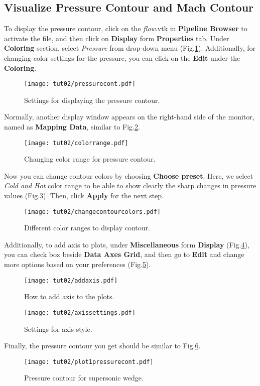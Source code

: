 \subsection{Visualize Pressure Contour and Mach Contour}
To display the pressure contour, click on the \textit{flow}.vtk in \textbf{Pipeline Browser} to activate the file, and then click on \textbf{Display} form \textbf{Properties} tab. Under \textbf{Coloring} section, select \textit{Pressure} from drop-down menu (Fig.\ref{fig2:pressure contours setting}). Additionally, for changing color settings for the pressure, you can click on the \textbf{Edit} under the \textbf{Coloring}.
\begin{figure}[htbp]
    \centering
    \texttt{[image: tut02/pressurecont.pdf]}
    \caption{Settings for displaying the pressure contour.}
    \label{fig2:pressure contours setting}
\end{figure}
Normally, another display window appears on the right-hand side of the monitor, named as \textbf{Mapping Data}, similar to Fig.\ref{fig2:color_range}.
\begin{figure}[htbp]
    \centering
    \texttt{[image: tut02/colorrange.pdf]}
    \caption{Changing color range for pressure contour.}
    \label{fig2:color_range}
\end{figure}
Now you can change contour colors by choosing \textbf{Choose preset}. Here, we select \textit{Cold and Hot} color range to be able to show clearly the sharp changes in pressure values (Fig.\ref{fig2:color_range_item}). Then, click \textbf{Apply} for the next step.
\begin{figure}[htbp]
    \centering
    \texttt{[image: tut02/changecontourcolors.pdf]}
    \caption{Different color ranges to display contour.}
    \label{fig2:color_range_item}
\end{figure}
Additionally, to add axis to plots, under \textbf{Miscellaneous} form \textbf{Display} (Fig.\ref{fig2:add axis}), you can check box beside \textbf{Data Axes Grid}, and then go to \textbf{Edit} and change more options based on your preferences (Fig.\ref{fig2:axis setting}).
\begin{figure}[htbp]
    \centering
    \texttt{[image: tut02/addaxis.pdf]}
    \caption{How to add axis to the plots.}
    \label{fig2:add axis}
\end{figure}
\begin{figure}[htbp]
    \centering
    \texttt{[image: tut02/axissettings.pdf]}
    \caption{Settings for axis style.}
    \label{fig2:axis setting}
\end{figure}
Finally, the pressure contour you get should be similar to Fig.\ref{fig2:plot pressure cont1}.
\begin{figure}[htbp]
    \centering
    \texttt{[image: tut02/plot1pressurecont.pdf]}
    \caption{Pressure contour for supersonic wedge.}
    \label{fig2:plot pressure cont1}
\end{figure}

